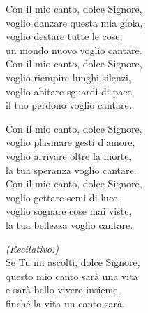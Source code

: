 
\strofa Con il mio canto, dolce Signore,\\
voglio danzare questa mia gioia,\\
voglio destare tutte le cose,\\
un mondo nuovo voglio cantare.\\
Con il mio canto, dolce Signore,\\
voglio riempire lunghi silenzi,\\
voglio abitare sguardi di pace,\\
il tuo perdono voglio cantare.

\spazio


\spazio

\strofa Con il mio canto, dolce Signore,\\
voglio plasmare gesti d'amore,\\
voglio arrivare oltre la morte,\\
la tua speranza voglio cantare.\\
Con il mio canto, dolce Signore,\\
voglio gettare semi di luce,\\
voglio sognare cose mai viste,\\
la tua bellezza voglio cantare.

\spazio


\spazio

\emph{(Recitativo:)}\\
Se Tu mi ascolti, dolce Signore,\\
questo mio canto sarà una vita\\
e sarà bello vivere insieme,\\
finché la vita un canto sarà.

\spazio

